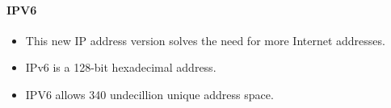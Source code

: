 \begin{flushleft}
\begin{itemize}
	\paragraph{IPV6}
	\begin{itemize}
		\item This new IP address version solves the need for more Internet addresses.
		\item IPv6 is a 128-bit hexadecimal address.
		\item IPV6 allows 340 undecillion unique address space.
	\end{itemize}
\end{itemize}

	

	

	
	

	
	
	
\end{flushleft}
\newpage


